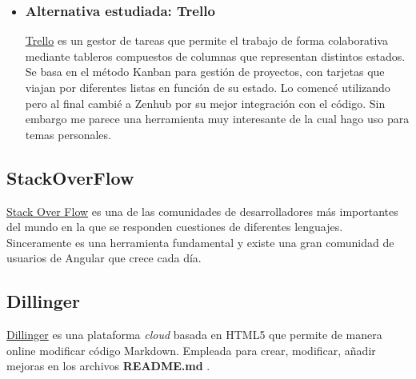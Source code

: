     
\begin{itemize}
 	\item 	 \subsubsection{Alternativa estudiada: Trello}\label{trello}
\href{https://www.trello.com/}{Trello}  es un gestor de tareas que permite el trabajo de forma colaborativa mediante tableros compuestos de columnas  que representan distintos estados. Se basa en el método Kanban para gestión de proyectos, con tarjetas que viajan por diferentes listas en función de su estado. Lo comencé utilizando pero al final cambié a Zenhub por su mejor integración con el código. Sin embargo me parece una herramienta muy interesante de la cual hago uso para temas personales.  
\end{itemize}

 \subsection{StackOverFlow}\label{otrasherramientas_dillinger}

\href{https://stackoverflow.com/}{Stack Over Flow} es una de las comunidades de desarrolladores más importantes del mundo \cite{articulo2} en la que se responden cuestiones de diferentes lenguajes. Sinceramente es una herramienta fundamental y existe una gran comunidad de usuarios de Angular que crece cada día.


   \subsection{Dillinger}\label{otrasherramientas_dillinger}
    \href{https://www.zenhub.io/}{Dillinger} es una plataforma \emph{cloud}  basada en HTML5  que permite de manera online modificar código Markdown. Empleada para crear, modificar, añadir mejoras en los archivos \textbf{README.md} .
     
     




